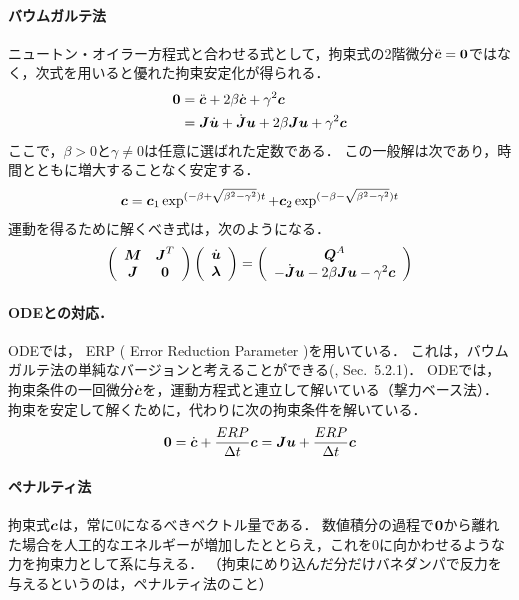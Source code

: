 \documentclass{jsarticle}
\begin{document}
\paragraph{バウムガルテ法}
ニュートン・オイラー方程式と合わせる式として，拘束式の2階微分$\ddot{\mbox{\boldmath $c$}}=\mbox{\bf 0}$ではなく，次式を用いると優れた拘束安定化が得られる．
\begin{align*}
\mbox{\bf 0}
&= \ddot{\mbox{\boldmath $c$}} + 2\beta \dot{\mbox{\boldmath $c$}} + \gamma^2\mbox{\boldmath $c$} \\
&= \mbox{\boldmath $J$}\dot{\mbox{\boldmath $u$}}+\dot{\mbox{\boldmath $J$}}\mbox{\boldmath $u$} + 2\beta\mbox{\boldmath $J$}\mbox{\boldmath $u$} + \gamma^2\mbox{\boldmath $c$}
\end{align*}
ここで，$\beta>0$と$\gamma\neq 0$は任意に選ばれた定数である．
この一般解は次であり，時間とともに増大することなく安定する．
\begin{align*}
 \mbox{\boldmath $c$} = \mbox{\boldmath $c$}_1\exp^{(-\beta+\sqrt{\beta^2-\gamma^2})t}+\mbox{\boldmath $c$}_2\exp^{(-\beta-\sqrt{\beta^2-\gamma^2})t}
\end{align*}
運動を得るために解くべき式は，次のようになる．
\begin{align}
   \left(
    \begin{array}{cc}
       \mbox{\boldmath $M$}   & \mbox{\boldmath $J$}^T\\
       \mbox{\boldmath $J$}   & \mbox{\bf 0}
    \end{array}
   \right)
   \left(
    \begin{array}{c}
       \dot{\mbox{\boldmath $u$}}\\
       \mbox{\boldmath $\lambda$}
    \end{array}
   \right)
=
   \left(
    \begin{array}{c}
       \mbox{\boldmath $Q$}^A\\
       -\dot{\mbox{\boldmath $J$}}\mbox{\boldmath $u$}-2\beta\mbox{\boldmath $J$}\mbox{\boldmath $u$}-\gamma^2\mbox{\boldmath $c$}
    \end{array}
   \right)\label{Baumgarte_method}
\end{align}

\paragraph{ODEとの対応．}
ODEでは， ERP ( Error Reduction Parameter )を用いている．
これは，バウムガルテ法の単純なバージョンと考えることができる(\cite{MThesis2005Garstenauer}, Sec.~5.2.1)．
ODEでは，拘束条件の一回微分$\dot{\mbox{\boldmath $c$}}$を，運動方程式と連立して解いている（撃力ベース法）．
拘束を安定して解くために，代わりに次の拘束条件を解いている．
\begin{align*}
 \mbox{\bf 0}=\dot{\mbox{\boldmath $c$}} + \frac{ERP}{\Delta t}\mbox{\boldmath $c$} = \mbox{\boldmath $J$}\mbox{\boldmath $u$} + \frac{ERP}{\Delta t}\mbox{\boldmath $c$}
\end{align*}

\paragraph{ペナルティ法}
拘束式$\mbox{\boldmath $c$}$は，常に0になるべきベクトル量である．
数値積分の過程で$\mbox{\bf 0}$から離れた場合を人工的なエネルギーが増加したととらえ，これを0に向かわせるような力を拘束力として系に与える．
（拘束にめり込んだ分だけバネダンパで反力を与えるというのは，ペナルティ法のこと）
\end{document}
